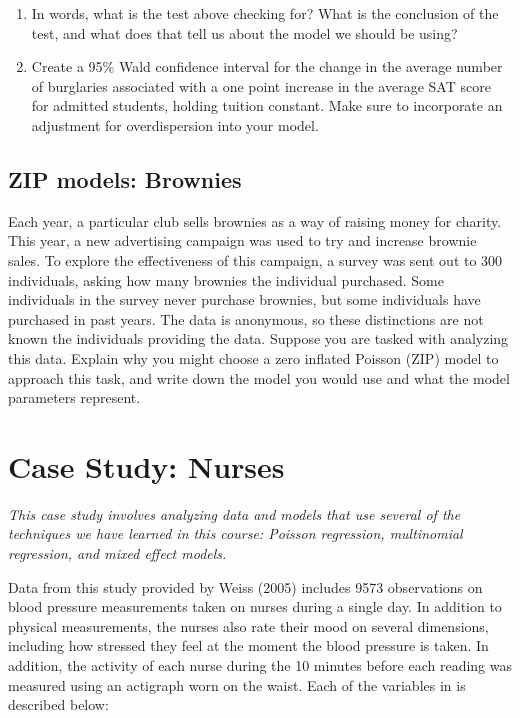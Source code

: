 \documentclass[11pt]{article}
\begin{document}
\begin{enumerate}
\item In words, what is the test above checking for? What is the conclusion of the test, and what does that tell us about the model we should be using? 

\vspace{7cm} 

\item Create a 95\% Wald confidence interval for the change in the average number of burglaries associated with a one point increase in the average SAT score for admitted students, holding tuition constant. Make sure to incorporate an adjustment for overdispersion into your model.

\end{enumerate}

\newpage

\subsection{ZIP models: Brownies}

Each year, a particular club sells brownies as a way of raising money for charity. This year, a new advertising campaign was used to try and increase brownie sales. To explore the effectiveness of this campaign, a survey was sent out to 300 individuals, asking how many brownies the individual purchased. Some individuals in the survey never purchase brownies, but some individuals have purchased in past years. The data is anonymous, so these distinctions are not known the individuals providing the data. Suppose you are tasked with analyzing this data. Explain why you might choose a zero inflated Poisson (ZIP) model to approach this task, and write down the model you would use and what the model parameters represent.


\newpage

\section{Case Study: Nurses}

\textit{This case study involves analyzing data and models that use several of the techniques we have learned in this course: Poisson regression, multinomial regression, and mixed effect models.}

Data from this study provided by Weiss (2005) includes 9573 observations on blood pressure measurements taken on nurses during a single day. In addition to physical measurements, the nurses also rate their mood on several dimensions, including how stressed they feel at the moment the blood pressure is taken. In addition, the activity of each nurse during the 10 minutes before each reading was measured using an actigraph worn on the waist. Each of the variables in is described below:
\end{document}
